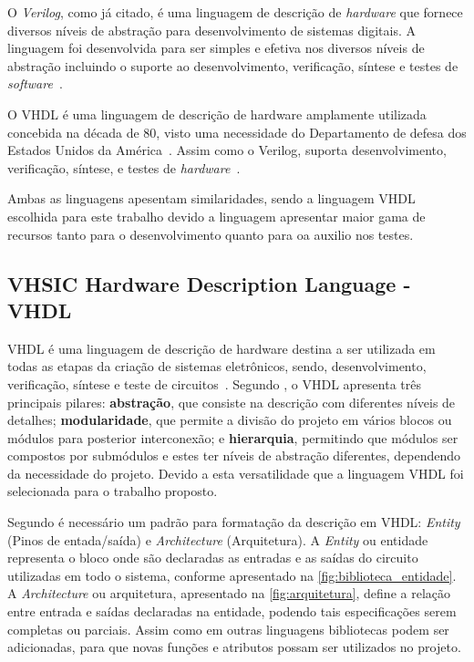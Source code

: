 \par
O \textit{Verilog}, como já citado, é uma linguagem de descrição de \textit{hardware} que fornece diversos níveis de abstração para desenvolvimento de sistemas digitais\cite{thomas2008verilog}. A linguagem foi desenvolvida para ser simples e efetiva nos diversos níveis de abstração incluindo o suporte ao desenvolvimento, verificação, síntese e testes de \textit{software}~\cite{IEEEVerilogLanguage}.


\par
O VHDL é uma linguagem de descrição de hardware amplamente utilizada concebida na década de 80, visto uma necessidade do Departamento de defesa dos Estados Unidos da América~\cite{cappelattipraticando}. Assim como o Verilog, suporta desenvolvimento, verificação, síntese, e testes de \textit{hardware}~\cite{IEEEVHDLLanguage}.

\par
Ambas as linguagens apesentam similaridades, sendo a linguagem VHDL escolhida para este trabalho devido a linguagem apresentar maior gama de recursos tanto para o desenvolvimento quanto para oa auxilio nos testes.

\subsection{VHSIC Hardware Description Language - VHDL}

VHDL é uma linguagem de descrição de hardware destina a ser utilizada em todas as etapas da criação de sistemas eletrônicos, sendo, desenvolvimento, verificação, síntese e teste de circuitos~\cite{IEEEVHDLLanguage}.
% 
Segundo \cite{cappelattipraticando}, o VHDL apresenta três principais pilares: \textbf{abstração}, que consiste na descrição com diferentes níveis de detalhes; \textbf{modularidade}, que permite a divisão do projeto em vários blocos ou módulos para posterior interconexão; e \textbf{hierarquia}, permitindo que módulos ser compostos por submódulos e estes ter níveis de abstração diferentes, dependendo da necessidade do projeto. Devido a esta versatilidade que a linguagem VHDL foi selecionada para o trabalho proposto.

\par
Segundo \cite{IEEEVHDLLanguage} é necessário um padrão para formatação da descrição em VHDL: \textit{Entity} (Pinos de entada/saída) e \textit{Architecture} (Arquitetura). A \textit{Entity} ou entidade representa o bloco onde são declaradas as entradas e as saídas do circuito utilizadas em todo o sistema, conforme apresentado na \autoref{fig:biblioteca_entidade}. A \textit{Architecture} ou arquitetura, apresentado na \autoref{fig:arquitetura}, define a relação entre entrada e saídas declaradas na entidade, podendo tais especificações serem completas ou parciais. Assim como em outras linguagens bibliotecas podem ser adicionadas, para que novas funções e atributos possam ser utilizados no projeto.

